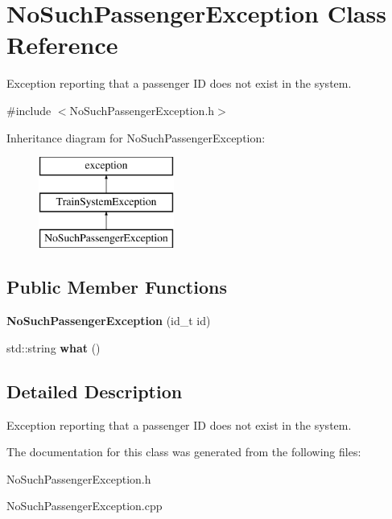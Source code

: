 \hypertarget{classNoSuchPassengerException}{}\section{No\+Such\+Passenger\+Exception Class Reference}
\label{classNoSuchPassengerException}


Exception reporting that a passenger ID does not exist in the system.  




{\ttfamily \#include $<$No\+Such\+Passenger\+Exception.\+h$>$}

Inheritance diagram for No\+Such\+Passenger\+Exception\+:\begin{figure}[H]
\begin{center}
\leavevmode
\includegraphics[height=3.000000cm]{classNoSuchPassengerException}
\end{center}
\end{figure}
\subsection*{Public Member Functions}
\begin{DoxyCompactItemize}
\item 
\mbox{\label{classNoSuchPassengerException_a592e57495c93657a25e7da49da5b6649}} 
{\bfseries No\+Such\+Passenger\+Exception} (id\+\_\+t id)
\item 
\mbox{\label{classNoSuchPassengerException_a27bf9b4347fee63ddc405d58d217d82e}} 
std\+::string {\bfseries what} ()
\end{DoxyCompactItemize}


\subsection{Detailed Description}
Exception reporting that a passenger ID does not exist in the system. 

The documentation for this class was generated from the following files\+:\begin{DoxyCompactItemize}
\item 
No\+Such\+Passenger\+Exception.\+h\item 
No\+Such\+Passenger\+Exception.\+cpp\end{DoxyCompactItemize}
